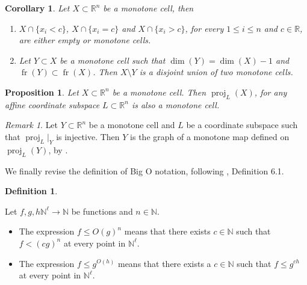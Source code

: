 \documentclass[
]{book}
\providecommand{\tightlist}{%
  \setlength{\itemsep}{0pt}\setlength{\parskip}{0pt}}
\newtheorem{corollary}{Corollary}[chapter]
\newtheorem{proposition}{Proposition}[chapter]
\theoremstyle{definition}
\newtheorem{definition}{Definition}[chapter]
\theoremstyle{definition}
\theoremstyle{definition}
\theoremstyle{definition}
\theoremstyle{remark}
\newtheorem*{remark}{Remark}
\begin{document}
\begin{corollary}

\citep[Corollary 7, Theorem 11]{bgv13}
Let \(X \subset \mathbb{R}^n\) be a monotone cell, then

\begin{enumerate}
\def\labelenumi{\arabic{enumi}.}
\tightlist
\item
  \(X \cap \{ x_i < c \}\), \(X \cap \{ x_i = c \}\) and \(X \cap \{ x_i > c \}\), for every \(1 \le i \le n\) and \(c \in \mathbb{R}\), are either empty or monotone cells.
\item
  Let \(Y \subset X\) be a monotone cell such that \(\dim(Y) = \dim(X) - 1\) and \({\operatorname{fr} \left( Y \right)} \subset {\operatorname{fr} \left( X \right)}\). Then \(X \setminus Y\) is a disjoint union of two monotone cells.
\end{enumerate}

\end{corollary}

\begin{proposition}
\citep[Theorem 10]{bgv13}
Let \(X \subset \mathbb{R}^n\) be a monotone cell. Then \(\operatorname{proj}_{L}(X)\), for any affine coordinate subspace \(L \subset \mathbb{R}^n\) is also a monotone cell.
\end{proposition}

\begin{remark}
\citep[Remark 2.11]{bgv15}
Let \(Y \subset \mathbb{R}^n\) be a monotone cell and \(L\) be a coordinate subspace such that \(\operatorname{proj}_L\vert_Y\) is injective.
Then \(Y\) is the graph of a monotone map defined on \(\operatorname{proj}_L(Y)\), by \citep[Theorem 7 and Corollary 5]{bgv13}.
\end{remark}

We finally revise the definition of Big O notation, following \citet{gv2009}, Definition 6.1.

\begin{definition}
\protect\hypertarget{def:big-o}{}\label{def:big-o}

\citep[Definition 6.1]{gv2009}
Let \(f,g,h \mathbb{N}^\ell \to \mathbb{N}\) be functions and \(n \in \mathbb{N}\).

\begin{itemize}
\tightlist
\item
  The expression \(f \le O(g)^n\) means that there exists \(c \in \mathbb{N}\) such that \(f < (cg)^n\) at every point in \(\mathbb{N}^\ell\).
\item
  The expression \(f \le g^{O(h)}\) means that there exists a \(c \in \mathbb{N}\) such that \(f \le g^{ch}\) at every point in \(\mathbb{N}^\ell\).
\end{itemize}

\end{definition}
\end{document}
